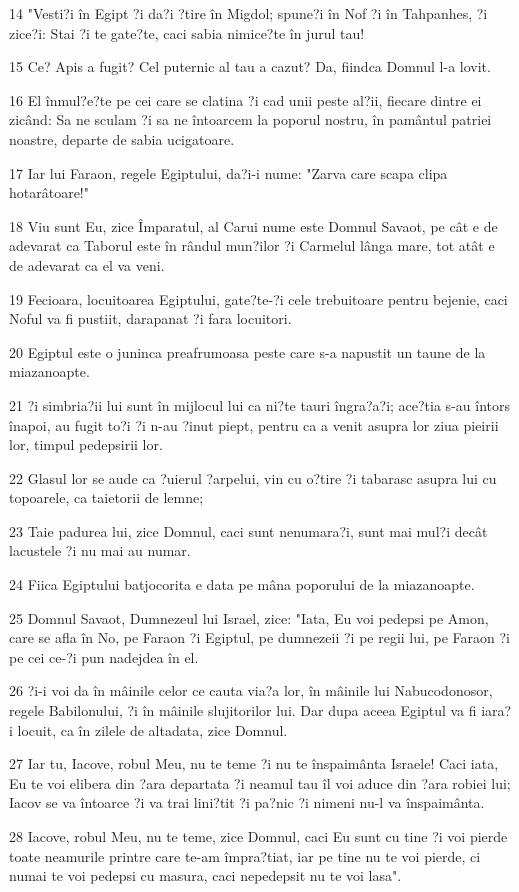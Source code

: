 \par 14 "Vesti?i în Egipt ?i da?i ?tire în Migdol; spune?i în Nof ?i în Tahpanhes, ?i zice?i: Stai ?i te gate?te, caci sabia nimice?te în jurul tau!
\par 15 Ce? Apis a fugit? Cel puternic al tau a cazut? Da, fiindca Domnul l-a lovit.
\par 16 El înmul?e?te pe cei care se clatina ?i cad unii peste al?ii, fiecare dintre ei zicând: Sa ne sculam ?i sa ne întoarcem la poporul nostru, în pamântul patriei noastre, departe de sabia ucigatoare.
\par 17 Iar lui Faraon, regele Egiptului, da?i-i nume: "Zarva care scapa clipa hotarâtoare!"
\par 18 Viu sunt Eu, zice Împaratul, al Carui nume este Domnul Savaot, pe cât e de adevarat ca Taborul este în rândul mun?ilor ?i Carmelul lânga mare, tot atât e de adevarat ca el va veni.
\par 19 Fecioara, locuitoarea Egiptului, gate?te-?i cele trebuitoare pentru bejenie, caci Noful va fi pustiit, darapanat ?i fara locuitori.
\par 20 Egiptul este o juninca preafrumoasa peste care s-a napustit un taune de la miazanoapte.
\par 21 ?i simbria?ii lui sunt în mijlocul lui ca ni?te tauri îngra?a?i; ace?tia s-au întors înapoi, au fugit to?i ?i n-au ?inut piept, pentru ca a venit asupra lor ziua pieirii lor, timpul pedepsirii lor.
\par 22 Glasul lor se aude ca ?uierul ?arpelui, vin cu o?tire ?i tabarasc asupra lui cu topoarele, ca taietorii de lemne;
\par 23 Taie padurea lui, zice Domnul, caci sunt nenumara?i, sunt mai mul?i decât lacustele ?i nu mai au numar.
\par 24 Fiica Egiptului batjocorita e data pe mâna poporului de la miazanoapte.
\par 25 Domnul Savaot, Dumnezeul lui Israel, zice: "Iata, Eu voi pedepsi pe Amon, care se afla în No, pe Faraon ?i Egiptul, pe dumnezeii ?i pe regii lui, pe Faraon ?i pe cei ce-?i pun nadejdea în el.
\par 26 ?i-i voi da în mâinile celor ce cauta via?a lor, în mâinile lui Nabucodonosor, regele Babilonului, ?i în mâinile slujitorilor lui. Dar dupa aceea Egiptul va fi iara?i locuit, ca în zilele de altadata, zice Domnul.
\par 27 Iar tu, Iacove, robul Meu, nu te teme ?i nu te înspaimânta Israele! Caci iata, Eu te voi elibera din ?ara departata ?i neamul tau îl voi aduce din ?ara robiei lui; Iacov se va întoarce ?i va trai lini?tit ?i pa?nic ?i nimeni nu-l va înspaimânta.
\par 28 Iacove, robul Meu, nu te teme, zice Domnul, caci Eu sunt cu tine ?i voi pierde toate neamurile printre care te-am împra?tiat, iar pe tine nu te voi pierde, ci numai te voi pedepsi cu masura, caci nepedepsit nu te voi lasa".

